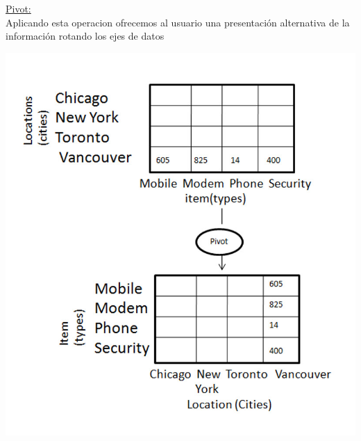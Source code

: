 \documentclass{fancyslides}
\begin{document}
\begin{frame}
\misc
{
  \underline{Pivot:}\\
  Aplicando esta operacion ofrecemos al usuario una presentación alternativa de la información rotando los ejes de datos
}
\end{frame}

\begin{frame}
\misc
{
  \begin{center}
  \includegraphics[scale=0.3]{pivot}
  \end{center}
}
\end{frame}
\end{document}
